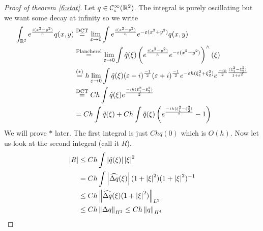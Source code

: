 \begin{proof}[Proof of theorem \ref{6:stat}]
  Let $q \in \mathcal{C}_c^\infty(\mathbb{R}^2)$.
  The integral is purely oscillating but we want some decay at infinity so we write
  \begin{align*}
    \int_{\mathbb{R}^2} e^\frac{i(x^2-y^2)}h q(x,y) &\overset{\text{DCT}}= \lim_{\varepsilon\to 0} \int e^\frac{i(x^2-y^2)}h e^{-\varepsilon(x^2+y^2)} q(x,y) \\
    &\overset{\text{Plancherel}}= \lim_{\varepsilon\to 0} \int \hat q(\xi) \left( e^\frac{i(x^2-y^2)}h e^{-\varepsilon(x^2-y^2)} \right)^\wedge (\xi) \\
    &\overset{(*)}= h \lim_{\varepsilon\to 0} \int \hat q(\xi) (\varepsilon-i)^\frac{-1}2 (\varepsilon+i)^\frac{-1}2 e^{-\varepsilon h(\xi_1^2+\xi_2^2)} e^{\frac{-ih}2 \frac{(\xi_1^2-\xi_2^2)}{1+\varepsilon^2}} \\
    &\overset{\text{DCT}}= Ch \int \hat q(\xi) e^\frac{-ih(\xi_1^2-\xi_2^2)}2 \\
    &= Ch \int \hat q(\xi) + Ch \int \hat q(\xi) \left( e^\frac{-ih(\xi_1^2-\xi_2^2)}2 -1 \right)
  \end{align*}
  We will prove $*$ later.
  The first integral is just $Chq(0)$ which is $O(h)$.
  Now let us look at the second integral (call it $R$).
  \begin{align*}
    \left\lvert R \right\rvert &\leq Ch \int \left\lvert \hat q(\xi) \right\rvert \left\lvert \xi \right\rvert^2 \\
    &= Ch \int \left\lvert \widehat{\Delta q}(\xi) \right\rvert (1+\left\lvert \xi \right\rvert^2)(1+\left\lvert \xi \right\rvert^2)^{-1} \\
    &\leq Ch \left\lVert \widehat{\Delta q}(\xi)(1+\left\lvert \xi \right\rvert^2) \right\rVert_{L^2} \\
    &\leq Ch \left\lVert \Delta q \right\rVert_{H^2} \leq Ch\left\lVert q \right\rVert_{H^4} \qedhere
  \end{align*}
\end{proof}
